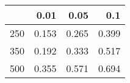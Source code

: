 % 
\begin{tabular}{rrrr}
  \hline
 & 0.01 & 0.05 & 0.1 \\ 
  \hline
250 & 0.153 & 0.265 & 0.399 \\ 
  350 & 0.192 & 0.333 & 0.517 \\ 
  500 & 0.355 & 0.571 & 0.694 \\ 
   \hline
\end{tabular}
